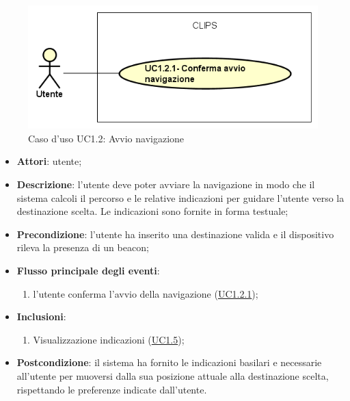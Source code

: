 \documentclass[../AnalisiDeiRequisiti.tex]{subfiles}
\begin{document}
\begin{figure}[H]
	\centering
	\includegraphics[scale=0.95, width=\textwidth]{img/UC1-2.png}
	\caption{Caso d'uso UC1.2: Avvio navigazione}\label{fig:UC1.2} 
\end{figure}
\begin{itemize}
	\item \textbf{Attori}: utente;
	\item \textbf{Descrizione}: l'utente deve poter avviare la navigazione in modo che il sistema calcoli il percorso e le relative indicazioni per guidare l'utente verso la destinazione scelta. Le indicazioni sono fornite in forma testuale; 
	\item \textbf{Precondizione}: l'utente ha inserito una destinazione valida e il dispositivo rileva la presenza di un beacon;
	
	\item \textbf{Flusso principale degli eventi}:
	\begin{enumerate}
		\item l'utente conferma l'avvio della navigazione (\hyperlink{UC1.2.1}{UC1.2.1});
		
	\end{enumerate}
	\item \textbf{Inclusioni}:
	\begin{enumerate}
		\item Visualizzazione indicazioni (\hyperlink{UC1.5}{UC1.5});
		
	\end{enumerate}
	\item \textbf{Postcondizione}: il sistema ha fornito le indicazioni basilari  e necessarie all'utente per muoversi dalla sua posizione attuale alla destinazione scelta, rispettando le preferenze indicate dall'utente.
\end{itemize}
\hypertarget{UC1.2.1}{}
\end{document}
